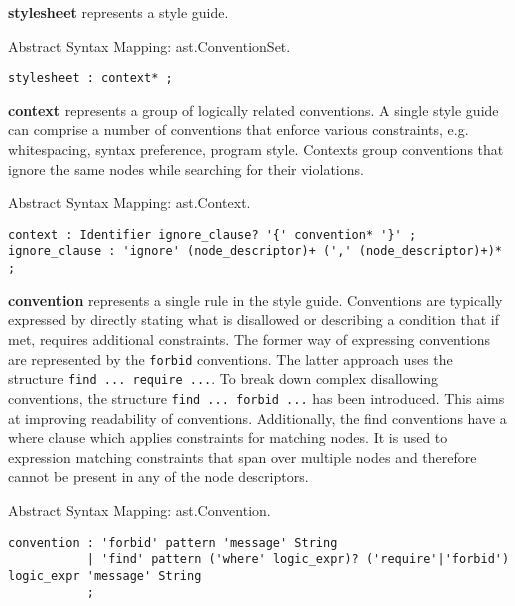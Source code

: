 \documentclass[parskip=full]{uvamscse}
\begin{document}
\begin{description}

\item\textbf{stylesheet} represents a style guide.

Abstract Syntax Mapping: ast.ConventionSet.

\begin{snippet}
\begin{verbatim}
stylesheet : context* ;
\end{verbatim}
\end{snippet}

\item\textbf{context} represents a group of logically related conventions. A single style guide can comprise a number of conventions that enforce various constraints, e.g. whitespacing, syntax preference, program style. Contexts group conventions that ignore the same nodes while searching for their violations.  

Abstract Syntax Mapping: ast.Context.

\begin{snippet}
\begin{verbatim}
context : Identifier ignore_clause? '{' convention* '}' ;
ignore_clause : 'ignore' (node_descriptor)+ (',' (node_descriptor)+)* ;
\end{verbatim}
\end{snippet}

\item\textbf{convention} represents a single rule in the style guide. Conventions are typically expressed by directly stating what is disallowed or describing a condition that if met, requires additional constraints. The former way of expressing conventions are represented by the \texttt{forbid} conventions. The latter approach uses the structure \texttt{find ... require ...}. To break down complex disallowing conventions, the structure \texttt{find ... forbid ...} has been introduced. This aims at improving readability of conventions. Additionally, the find conventions have a where clause which applies constraints for matching nodes. It is used to expression matching constraints that span over multiple nodes and therefore cannot be present in any of the node descriptors.

Abstract Syntax Mapping: ast.Convention.

\begin{snippet}
\begin{verbatim}
convention : 'forbid' pattern 'message' String
           | 'find' pattern ('where' logic_expr)? ('require'|'forbid') logic_expr 'message' String
           ;
\end{verbatim}
\end{snippet}


\end{description}
\end{document}
